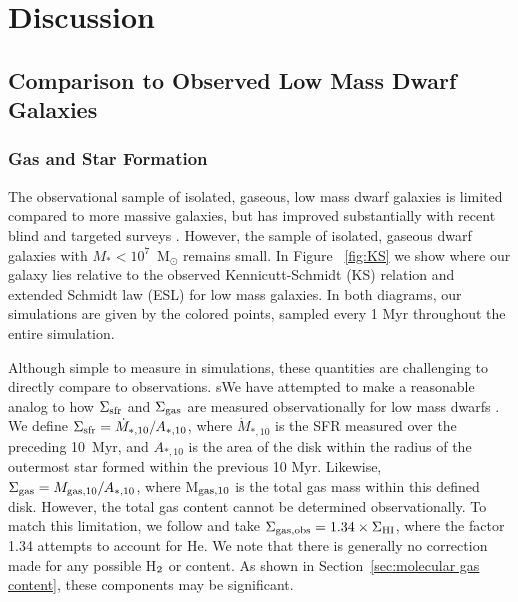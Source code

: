 \documentclass[twocolumn]{aastex61}
\begin{document}
\section{Discussion}
\label{sec:discussion}

\subsection{Comparison to Observed Low Mass Dwarf Galaxies}
\label{sec:observation}

\subsubsection{Gas and Star Formation}
\label{sec:gas_sf}

The observational sample of isolated, gaseous, low mass dwarf galaxies is limited compared to more massive galaxies, but has improved substantially with recent blind and targeted  surveys \citep[e.g.][]{Giovanelli2005, Geha2006, Geha2012, Walter2008, Cannon2011, Haynes2011, Hunter2012, Bradford2015, James2015, Tollerud2015, Sand2015, Wang2017}. However, the sample of isolated, gaseous dwarf galaxies with $M_{*} < 10^{7}$~M$_{\odot}$ remains small. In Figure ~\ref{fig:KS} we show where our galaxy lies relative to the observed Kennicutt-Schmidt (KS) relation and extended Schmidt law (ESL)  for low mass galaxies. In both diagrams, our simulations are given by the colored points, sampled every 1 Myr throughout the entire simulation. 

Although simple to measure in simulations, these quantities are challenging to directly compare to observations. sWe have attempted to make a reasonable analog to how $\Sigma_{\rm sfr}$ and $\Sigma_{\rm gas}$ are measured observationally for low mass dwarfs \citet[see ][]{Roychowdhury2014}. We define $\Sigma_{\rm sfr} = \dot{M}_{*,10} / A_{*,10}$, where $\dot{M}_{*,10}$ is the SFR measured over the preceding 10~Myr, and $A_{*,10}$ is the area of the disk within the radius of the outermost star formed within the previous 10 Myr. Likewise, $\Sigma_{\rm gas} = M_{\rm gas,10} / A_{*,10}$, where M$_{\rm gas,10}$ is the total gas mass within this defined disk. However, the total gas content cannot be determined observationally. To match this limitation, we follow \cite{Roychowdhury2014} and take $\Sigma_{\rm gas, obs} = 1.34 \times \Sigma_{\rm HI}$, where the factor 1.34 attempts to account for He. We note that there is generally no correction made for any possible H$_{\rm 2}$ or  content. As shown in Section~\ref{sec:molecular gas content}, these components may be significant.
\end{document}
